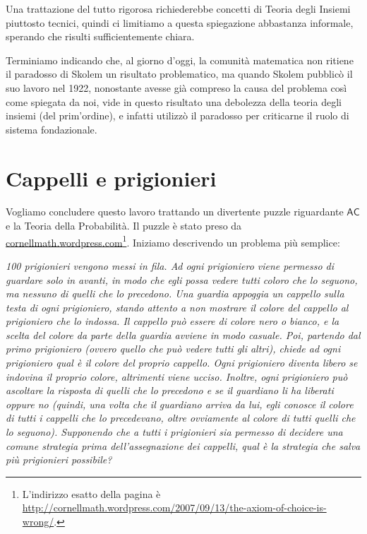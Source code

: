 \documentclass[12pt,a4paper]{report}
\theoremstyle{definition}
\theoremstyle{num.custom-title}
\newcommand{\AC}{\ensuremath{\mathsf{AC}}\xspace}
\begin{document}
Una trattazione del tutto rigorosa richiederebbe concetti di Teoria degli Insiemi piuttosto tecnici, quindi ci limitiamo a questa spiegazione abbastanza informale, sperando che risulti sufficientemente chiara.

Terminiamo indicando che, al giorno d'oggi, la comunità matematica non ritiene il paradosso di Skolem un risultato problematico, ma quando Skolem pubblicò il suo lavoro nel 1922, nonostante avesse già compreso la causa del problema così come spiegata da noi, vide in questo risultato una debolezza della teoria degli insiemi (del prim'ordine), e infatti utilizzò il paradosso per criticarne il ruolo di sistema fondazionale.



\chapter{Cappelli e prigionieri}

Vogliamo concludere questo lavoro trattando un divertente puzzle riguardante \AC e la Teoria della Probabilità. Il puzzle è stato preso da \url{cornellmath.wordpress.com}\footnote{L'indirizzo esatto della pagina è \url{http://cornellmath.wordpress.com/2007/09/13/the-axiom-of-choice-is-wrong/}.}. Iniziamo descrivendo un problema più semplice:
\begin{flushleft}
\emph{100 prigionieri vengono messi in fila. Ad ogni prigioniero viene permesso di guardare solo in avanti, in modo che egli possa vedere tutti coloro che lo seguono, ma nessuno di quelli che lo precedono. Una guardia appoggia un cappello sulla testa di ogni prigioniero, stando attento a non mostrare il colore del cappello al prigioniero che lo indossa. Il cappello può essere di colore nero o bianco, e la scelta del colore da parte della guardia avviene in modo casuale. Poi, partendo dal primo prigioniero (ovvero quello che può vedere tutti gli altri), chiede ad ogni prigioniero qual è il colore del proprio cappello. Ogni prigioniero diventa libero se indovina il proprio colore, altrimenti viene ucciso. Inoltre, ogni prigioniero può ascoltare la risposta di quelli che lo precedono e se il guardiano li ha liberati oppure no (quindi, una volta che il guardiano arriva da lui, egli conosce il colore di tutti i cappelli che lo precedevano, oltre ovviamente al colore di tutti quelli che lo seguono). Supponendo che a tutti i prigionieri sia permesso di decidere una comune strategia prima dell'assegnazione dei cappelli, qual è la strategia che salva più prigionieri possibile?}
\end{flushleft}
\end{document}
